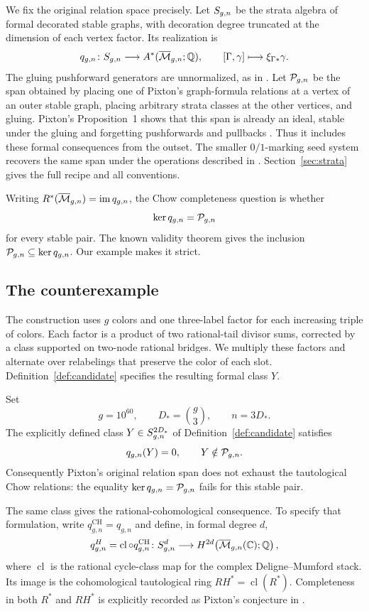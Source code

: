 We fix the original relation space precisely. Let \(S_{g,n}\) be the
strata algebra of formal decorated stable graphs, with decoration degree
truncated at the dimension of each vertex factor. Its realization is
\[
q_{g,n}\colon S_{g,n}\longrightarrow A^*(\overline{\mathcal M}_{g,n};\mathbb Q),
\qquad [\Gamma,\gamma]\longmapsto\xi_{\Gamma*}\gamma.
\]
The gluing pushforward generators are unnormalized, as in
\cite[Section~0.3]{PPZ}. Let \(\mathcal P_{g,n}\) be the span obtained by
placing one of Pixton's graph-formula relations at a vertex of an outer
stable graph, placing arbitrary strata classes at the other vertices,
and gluing. Pixton's Proposition~1 shows that this span is already an
ideal, stable under the gluing and forgetting pushforwards and pullbacks
\cite{Pixton}. Thus it includes these formal consequences from the
outset. The smaller \(0/1\)-marking seed system recovers the same span
under the operations described in \cite[Section~3.5]{PPZ}.
Section~\ref{sec:strata} gives the full recipe and all conventions.

Writing \(R^*(\overline{\mathcal M}_{g,n})=\operatorname{im} q_{g,n}\), the Chow completeness question is
whether
\[
\ker q_{g,n}=\mathcal P_{g,n}
\]
for every stable pair. The known validity theorem gives the inclusion
\(\mathcal P_{g,n}\subseteq\ker q_{g,n}\). Our example makes it strict.

\subsection{The counterexample}

The construction uses \(g\) colors and one three-label factor for each
increasing triple of colors. Each factor is a product of two
rational-tail divisor sums, corrected by a class supported on two-node
rational bridges. We multiply these factors and alternate over
relabelings that preserve the color of each slot.
Definition~\ref{def:candidate} specifies the resulting formal class \(Y\).

\begin{theorem}\label{thm:main}
Set
\[
g=10^{60},\qquad D_*=\binom g3,\qquad n=3D_*.
\]
The explicitly defined class \(Y\in S_{g,n}^{2D_*}\) of
Definition~\ref{def:candidate} satisfies
\[
q_{g,n}(Y)=0,\qquad Y\notin\mathcal P_{g,n}.
\]
Consequently Pixton's original relation span does not exhaust the
tautological Chow relations: the equality
\(\ker q_{g,n}=\mathcal P_{g,n}\) fails for this stable pair.
\end{theorem}

The same class gives the rational-cohomological consequence. To specify
that formulation, write \(q^{\mathrm{CH}}_{g,n}=q_{g,n}\) and define, in
formal degree \(d\),
\[
q^H_{g,n}=\operatorname{cl}\circ q^{\mathrm{CH}}_{g,n}
\colon S^d_{g,n}\longrightarrow
H^{2d}\!\left(\overline{\mathcal M}_{g,n}(\mathbb C);\mathbb Q\right),
\]
where \(\operatorname{cl}\) is the rational cycle-class map for the complex
Deligne--Mumford stack. Its image is the cohomological tautological ring
\(RH^*=\operatorname{cl}(R^*)\). Completeness in both \(R^*\) and \(RH^*\)
is explicitly recorded as Pixton's conjecture in
\cite[Section~1, Conjecture~1]{Canning2025}.

